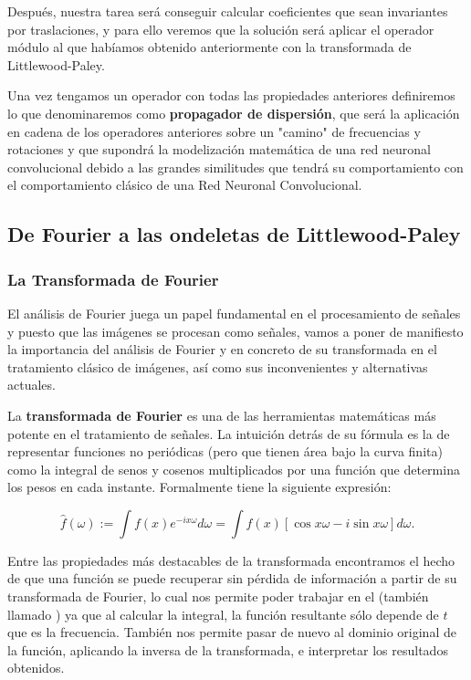 \medskip

\noindent Después, nuestra tarea será conseguir calcular coeficientes que sean invariantes por traslaciones, y para ello veremos que la solución será aplicar el operador módulo al que habíamos obtenido anteriormente con la transformada de Littlewood-Paley. 

\medskip

\noindent Una vez tengamos un operador con todas las propiedades anteriores definiremos lo que denominaremos como \textbf{propagador de dispersión}, que será la aplicación en cadena de los operadores anteriores sobre un "camino" de frecuencias y rotaciones y que supondrá la modelización matemática de una  red neuronal convolucional debido a las grandes similitudes que tendrá su comportamiento con el comportamiento clásico de una Red Neuronal Convolucional.



\subsection{De Fourier a las ondeletas de Littlewood-Paley}

\subsubsection{La Transformada de Fourier}

\noindent El análisis de Fourier juega un papel fundamental en el procesamiento de señales \cite{DigitalImageProcessing} y puesto que las imágenes se procesan como señales, vamos a poner de manifiesto la importancia del análisis de Fourier y en concreto de su transformada en el tratamiento clásico de imágenes, así como sus inconvenientes y alternativas actuales.

\medskip

\noindent La \textbf{transformada de Fourier} es una de las herramientas matemáticas más potente en el tratamiento de señales. La intuición detrás de su fórmula es la de representar funciones no periódicas (pero que tienen área bajo la curva finita) como la integral de senos y cosenos multiplicados por una función que determina los pesos en cada instante. Formalmente tiene la siguiente expresión:

$$\widehat{f}(\omega):= \int{f(x)e^{-ix\omega}d\omega}=\int{f(x)\left[\cos{x\omega} -i\sin{x\omega}\right]d\omega}.$$

\noindent Entre las propiedades más destacables de la transformada encontramos el hecho de que una función se puede recuperar sin pérdida de información a partir de su transformada de Fourier, lo cual nos permite poder trabajar en el  (también llamado ) ya que al calcular la integral, la función resultante sólo depende de $t$ que es la frecuencia. También nos permite pasar de nuevo al dominio original de la función, aplicando la inversa de la transformada, e interpretar los resultados obtenidos.

